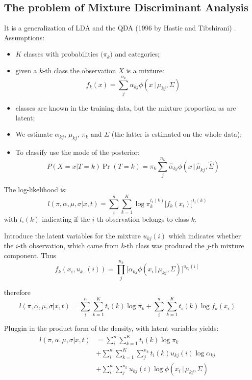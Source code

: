 \documentclass[a4paper]{article}
\begin{document}


\subsection{The problem of Mixture Discriminant Analysis} %
\label{sub:the_problem_of_mixture_discriminant_analysis}

It is a generalization of LDA and the QDA (1996 by Hastie and Tibshirani) . 
Assumptions: \begin{itemize}
	\item $K$ classes with probabilities $\big(\pi_k\big)$ and categories;
	\item given a $k$-th class the observation $X$ is a mixture:
	\[f_k(x) = \sum_j^{n_k}\alpha_{kj} \phi(x\,\lvert\,\mu_{kj}, \Sigma)\]
	\item classes are known in the training data, but the mixture proportion as are latent;
	\item We estimate $\alpha_{kj}$, $\mu_{kj}$, $\pi_k$ and $\Sigma$ (the latter is estimated on the whole data);
	\item To classify use the mode of the posterior:
	\[P(X=x\lvert T=k) \Pr(T=k) = \pi_k \sum_j^{n_k} \hat{\alpha}_{kj} \phi(x\,\lvert\,\hat{\mu}_{kj}, \hat{\Sigma})\]
\end{itemize}

The log-likelihood is:
\[l(\pi, \alpha, \mu, \sigma\lvert x, t) = \sum_i^n \sum_{k=1}^K \log \pi_k^{t_i(k)} \big[f_k(x_i)\big]^{t_i(k)}\]
with $t_i(k)$ indicating if the $i$-th observation belongs to class $k$.

Introduce the latent variables for the mixture $u_{kj}(i)$ which indicates whether the $i$-th observation, which
came from $k$-th class was produced the $j$-th mixture component. Thus
\[f_k(x_i, u_{k\cdot}(i)) = \prod_j^{n_k} \big[ \alpha_{kj} \phi(x_i\,\lvert\,\mu_{kj}, \Sigma)\big]^{u_{kj}(i)}\]

therefore
\[l(\pi, \alpha, \mu, \sigma\lvert x, t)
= \sum_i^n \sum_{k=1}^K t_i(k) \log \pi_k + \sum_i^n \sum_{k=1}^K t_i(k) \log f_k(x_i)\]

Pluggin in the product form of the density, with latent variables yields:
\begin{align*}
l(\pi, \alpha, \mu, \sigma\lvert x, t)
&= \sum_i^n \sum_{k=1}^K t_i(k) \log \pi_k\\
&+ \sum_i^n \sum_{k=1}^K \sum_j^{n_k} t_i(k) u_{kj}(i) \log \alpha_{kj}\\
&+ \sum_i^n \sum_j^{n_k} u_{kj}(i) \log \phi(x_i\,\lvert\,\mu_{kj}, \Sigma)
\end{align*}
\end{document}
